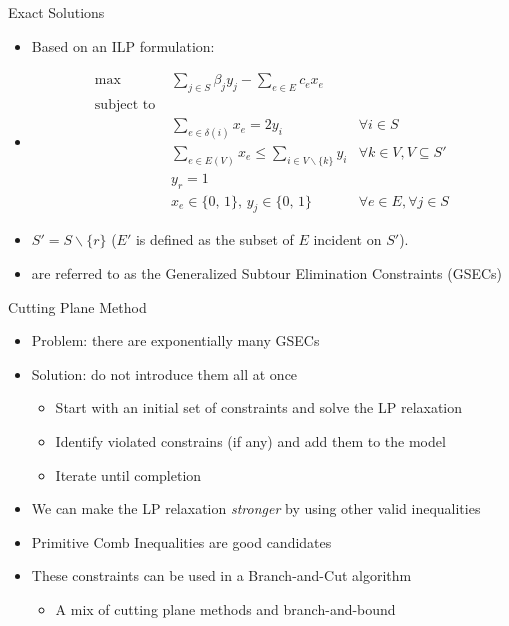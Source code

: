 \documentclass[10pt]{beamer}
\begin{document}
\begin{frame}{Exact Solutions}
\begin{itemize}
    \item<1-> Based on an ILP formulation:
    \item<2-> [ ] \begin{align} 
    \text {max } \label{pctsp_obj}     & \sum_{j\in S} \beta_j y_j  - \sum_{e\in E} c_e x_e &
    \\
    \text{subject to } \nonumber    &  & \\
    \label{const:pctsp1}               & \sum_{e \in \delta(i)} x_e = 2 y_{i}  & \forall i \in S \\
    \label{const:pctsp2}               & \sum_{e \in E(V) } x_e \leq \sum_{i \in V \backslash\{ k \}} y_{i} & \forall k \in V, V\subseteq S' \\
    \label{const:pctsp3}               & y_r = 1 \\
    \label{const:pctsp4}               & x_e \in \{0, \, 1\}, \, y_j \in \{0, \, 1\}  & \forall e \in E, \forall j \in S 
    \end{align}
    \item<3-> $S' = S \backslash \{r\}$ ($E'$ is defined as the subset of $E$ incident on $S'$).
    \item<4->  are referred to as the \alert{Generalized Subtour Elimination Constraints} (GSECs) 
\end{itemize}
\end{frame}

\begin{frame}[fragile]{Cutting Plane Method}
\begin{itemize}
    \item<1-> Problem: there are exponentially many GSECs
    \item<2-> Solution: do not introduce them all at once
    \begin{itemize}
        \item<3-> Start with an initial set of constraints and solve the LP relaxation
        \item<4-> Identify violated constrains (if any) and add them to the model
        \item<5-> Iterate until completion
    \end{itemize}
    \item<6-> We can make the LP relaxation \emph{stronger} by using other valid inequalities
    \item<7-> \alert{Primitive Comb Inequalities} are good candidates  
    \item<8-> These constraints can be used in a \alert{Branch-and-Cut} algorithm
    \begin{itemize}
        \item<9-> A mix of cutting plane methods and branch-and-bound
    \end{itemize}
\end{itemize}
\end{frame}
\end{document}
